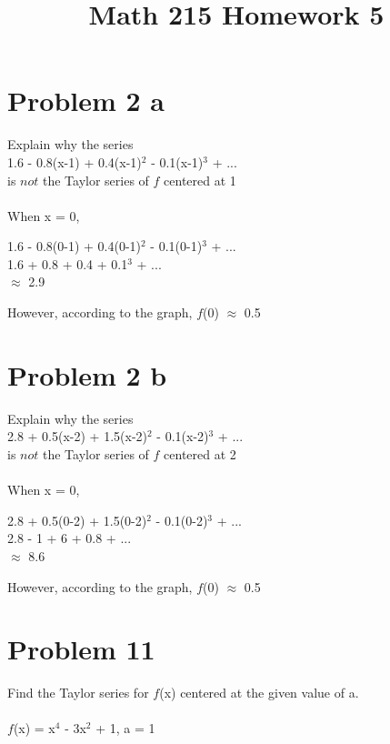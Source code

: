 \documentclass{article} %
\title{Math 215 Homework 5} %
\author{} %
\date{} %
\begin{document}
    \maketitle %
    
    \section*{Problem 2 a} %
    Explain why the series\\
    1.6 - 0.8(x-1) + 0.4(x-1)$^2$ - 0.1(x-1)$^3$ + ...\\
    is $not$ the Taylor series of $f$ centered at 1\\\\
    When x = 0,
    \begin{center}
        1.6 - 0.8(0-1) + 0.4(0-1)$^2$ - 0.1(0-1)$^3$ + ...\\
        1.6 + 0.8 + 0.4 + 0.1$^3$ + ...\\
        $\approx$ 2.9\\        
    \end{center}

    However, according to the graph, $f$(0) $\approx$ 0.5\\

    \section*{Problem 2 b} %
    Explain why the series\\
    2.8 + 0.5(x-2) + 1.5(x-2)$^2$ - 0.1(x-2)$^3$ + ...\\
    is $not$ the Taylor series of $f$ centered at 2\\\\
    When x = 0,
    \begin{center}
        2.8 + 0.5(0-2) + 1.5(0-2)$^2$ - 0.1(0-2)$^3$ + ...\\
        2.8 - 1 + 6 + 0.8 + ...\\
        $\approx$ 8.6\\ 
    \end{center}

    However, according to the graph, $f$(0) $\approx$ 0.5\\

    \vspace{2.5cm}
    \section*{Problem 11} %
    Find the Taylor series for $f$(x) centered at the given value of a.\\\\
    $f$(x) = x$^4$ - 3x$^2$ + 1, a = 1\\
\end{document}
